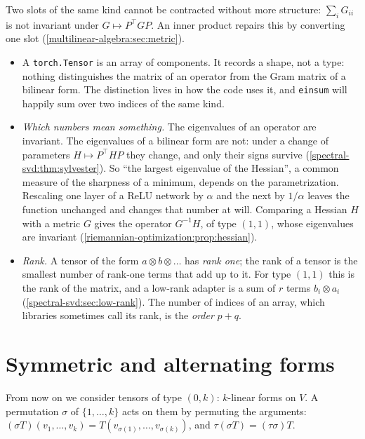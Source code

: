 \begin{notechapter}
Two slots of the same kind cannot be contracted without more structure:
$\sum_iG_{ii}$ is not invariant under $G\mapsto P^\top GP$. An inner
product repairs this by converting one slot
(\cref{multilinear-algebra:sec:metric}).

\begin{mlthread}
\begin{itemize}[nosep]
  \item A \texttt{torch.Tensor} is an array of components. It records a
        shape, not a type: nothing distinguishes the matrix of an
        operator from the Gram matrix of a bilinear form. The
        distinction lives in how the code uses it, and
        \texttt{einsum} will happily sum over two indices of the same
        kind.
  \item \emph{Which numbers mean something.} The eigenvalues of an
        operator are invariant. The eigenvalues of a bilinear form are
        not: under a change of parameters $H\mapsto P^\top HP$ they
        change, and only their signs survive
        (\cref{spectral-svd:thm:sylvester}). So ``the largest eigenvalue of the
        Hessian'', a common measure of the sharpness of a minimum,
        depends on the parametrization. Rescaling one layer of a ReLU
        network by $\alpha$ and the next by $1/\alpha$ leaves the
        function unchanged and changes that number at will. Comparing
        a Hessian $H$ with a metric $G$ gives the operator $G^{-1}H$,
        of type $(1, 1)$, whose eigenvalues are invariant
        (\cref{riemannian-optimization:prop:hessian}).
  \item \emph{Rank.} A tensor of the form
        $a\otimes b\otimes\dots$ has \emph{rank one}; the rank of a
        tensor is the smallest number of rank-one terms that add up to
        it. For type $(1, 1)$ this is the rank of the matrix, and a
        low-rank adapter is a sum of $r$ terms $b_i\otimes a_i$
        (\cref{spectral-svd:sec:low-rank}). The number of indices of an
        array, which libraries sometimes call its rank, is the
        \emph{order} $p + q$.
\end{itemize}
\end{mlthread}

\section{Symmetric and alternating forms}
\label{multilinear-algebra:sec:alternating}

From now on we consider tensors of type $(0, k)$: $k$-linear forms on
$V$. A permutation $\sigma$ of $\{1,\dots,k\}$ acts on them by permuting
the arguments:
$(\sigma T)(v_1,\dots,v_k) = T(v_{\sigma(1)},\dots,v_{\sigma(k)})$, and
$\tau(\sigma T) = (\tau\sigma)T$.


\end{notechapter}
